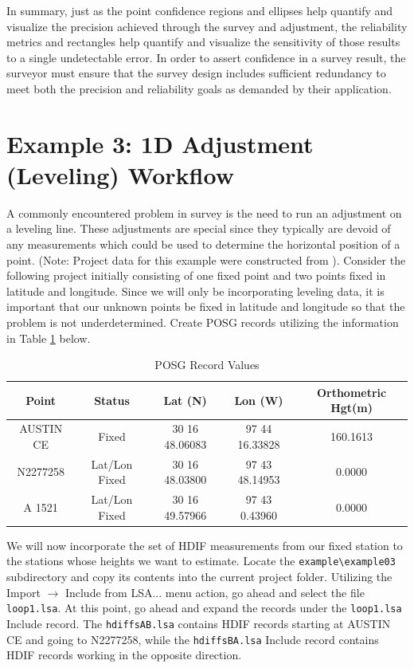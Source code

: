 In summary, just as the point confidence regions and ellipses help quantify and visualize the precision achieved through the survey and adjustment, the reliability metrics and rectangles help quantify and visualize the sensitivity of those results to a single undetectable error.  In order to assert confidence in a survey result, the surveyor must ensure that the survey design includes sufficient redundancy to meet both the precision and reliability goals as demanded by their application.

\newpage

\section{Example 3: 1D Adjustment (Leveling) Workflow}
A commonly encountered problem in survey is the need to run an adjustment on a leveling line.  These adjustments are special since they typically are devoid of any measurements which could be used to determine the horizontal position of a point. (Note: Project data for this example were constructed from \cite{ngsSlopeSurvey}). Consider the following project initially consisting of one fixed point and two points fixed in latitude and longitude. Since we will only be incorporating leveling data, it is important that our unknown points be fixed in latitude and longitude so that the problem is not underdetermined. Create POSG records utilizing the information in Table \ref{tab:POSGleveling} below.

\begin{table}[htb]
\caption{POSG Record Values}
\vspace{-0.4 cm}
\label{tab:POSGleveling}
\begin{center}
\resizebox{\textwidth}{!}
{\begin{tabular}{ccccc}
	\hline
	\textbf{Point} &\textbf{Status} &\textbf{Lat (N)} &\textbf{Lon (W)} &\textbf{Orthometric Hgt(m)} \\
	\hline
	AUSTIN CE & Fixed & 30 16 48.06083 & 97 44 16.33828 & 160.1613 \\
	N2277258 & Lat/Lon Fixed & 30 16 48.03800 & 97 43 48.14953 & 0.0000 \\
	A 1521 & Lat/Lon Fixed & 30 16 49.57966 & 97 43 0.43960 & 0.0000 \\
	\hline
\end{tabular}}
\end{center}
\end{table}

We will now incorporate the set of HDIF measurements from our fixed station to the stations whose heights we want to estimate. Locate the \verb+example\example03+ subdirectory and copy its contents into the current project folder. Utilizing the Import $\to$ Include from LSA... menu action, go ahead and select the file \verb+loop1.lsa+. At this point, go ahead and expand the records under the \verb+loop1.lsa+ Include record. The \verb+hdiffsAB.lsa+ contains HDIF records starting at AUSTIN CE and going to N2277258, while the \verb+hdiffsBA.lsa+ Include record contains HDIF records working in the opposite direction. 

